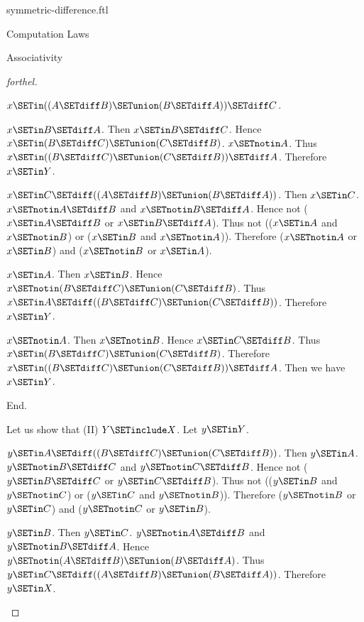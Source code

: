 \documentclass{naproche-library}
\begin{document}
\begin{smodule}[title=Symmetric Difference]{symmetric-difference.ftl}
\begin{sfragment}{Computation Laws}
\begin{sfragment}{Associativity}
\begin{proof}[forthel]
\begin{case}{$x \SETin ((A \SETdiff B) \SETunion (B \SETdiff A)) \SETdiff C$.}
          \begin{case}{$x \SETin B \SETdiff A$.}
            Then $x \SETin B \SETdiff C$.
            Hence $x \SETin (B \SETdiff C) \SETunion (C \SETdiff B)$. $x \SETnotin A$.
            Thus $x \SETin ((B \SETdiff C) \SETunion (C \SETdiff B)) \SETdiff A$.
            Therefore $x \SETin Y$.
          \end{case}
        \end{case}

        \begin{case}{$x \SETin C \SETdiff ((A \SETdiff B) \SETunion (B \SETdiff A))$.}
          Then $x \SETin C$.
          $x \SETnotin A \SETdiff B$ and $x \SETnotin B \SETdiff A$.
          Hence not ($x \SETin A \SETdiff B$ or $x \SETin B \SETdiff A$).
          Thus not (($x \SETin A$ and $x \SETnotin B$) or ($x \SETin B$ and $x \SETnotin A$)).
          Therefore ($x \SETnotin A$ or $x \SETin B$) and ($x \SETnotin B$ or $x \SETin A$).

          \begin{case}{$x \SETin A$.}
            Then $x \SETin B$.
            Hence $x \SETnotin (B \SETdiff C) \SETunion (C \SETdiff B)$.
            Thus $x \SETin A \SETdiff ((B \SETdiff C) \SETunion (C \SETdiff B))$.
            Therefore $x \SETin Y$.
          \end{case}

          \begin{case}{$x \SETnotin A$.}
            Then $x \SETnotin B$.
            Hence $x \SETin C \SETdiff B$.
            Thus $x \SETin (B \SETdiff C) \SETunion (C \SETdiff B)$.
            Therefore $x \SETin ((B \SETdiff C) \SETunion (C \SETdiff B)) \SETdiff A$.
            Then we have $x \SETin Y$.
          \end{case}
        \end{case}
      End.

      Let us show that (II) $Y \SETinclude X$.
        Let $y \SETin Y$.

        \begin{case}{$y \SETin A \SETdiff ((B \SETdiff C) \SETunion (C \SETdiff B))$.}
          Then $y \SETin A$.
          $y \SETnotin B \SETdiff C$ and $y \SETnotin C \SETdiff B$.
          Hence not ($y \SETin B \SETdiff C$ or $y \SETin C \SETdiff B$).
          Thus not (($y \SETin B$ and $y \SETnotin C$) or ($y \SETin C$ and $y \SETnotin B$)).
          Therefore ($y \SETnotin B$ or $y \SETin C$) and ($y \SETnotin C$ or $y \SETin B$).

          \begin{case}{$y \SETin B$.}
            Then $y \SETin C$.
            $y \SETnotin A \SETdiff B$ and $y \SETnotin B \SETdiff A$.
            Hence $y \SETnotin (A \SETdiff B) \SETunion (B \SETdiff A)$.
            Thus $y \SETin C \SETdiff ((A \SETdiff B) \SETunion (B \SETdiff A))$.
            Therefore $y \SETin X$.
          \end{case}


\end{case}
\end{proof}
\end{sfragment}
\end{sfragment}
\end{smodule}
\end{document}

